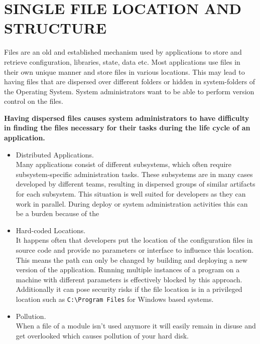 \newpage
\section*{SINGLE FILE LOCATION AND STRUCTURE}
Files are an old and established mechanism used by applications to store and retrieve configuration, libraries, state, data etc. Most applications use files in their own unique manner and store files in various locations. This may lead to having files that are dispersed over different folders or hidden in system-folders of the Operating System. System administrators  want to be able to perform version control on the files.
\begin{center}
  
\end{center}

\textbf{Having dispersed files causes system administrators to have difficulty in finding the files necessary for their tasks during the life cycle of an application.}\\

\begin{itemize}
\item Distributed Applications.\\
Many applications consist of different subsystems, which often require  subsystem-specific administration tasks. These subsystems are in many cases developed by different teams, resulting in dispersed groups of similar artifacts for each subsystem. This situation is well suited for developers as they can work in parallel. During deploy or system administration activities this can be a burden because of the
\item Hard-coded Locations.\\
It happens often that developers put the location of the configuration files in source code and provide no parameters or interface to influence this location. This means the path can only be changed by building and deploying a new version of the application. Running multiple instances of a program on a machine with different parameters is effectively blocked by this approach. Additionally it can pose security risks if the file location is in a privileged location such as \verb|C:\Program Files| for Windows based systems.
\item Pollution.\\
When a file of a module isn't used anymore it will easily remain in disuse and get overlooked which causes pollution of your hard disk.\\
\end{itemize}

